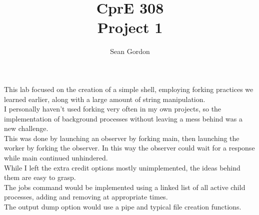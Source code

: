 \documentclass[12pt]{article}
\title{CprE 308\\Project 1}
\author{Sean Gordon}
\begin{document}
\maketitle

This lab focused on the creation of a simple shell, employing forking practices we learned earlier, along with a large amount of string manipulation.\\
I personally haven't used forking very often in my own projects, so the implementation of background processes without leaving a mess behind was a new challenge.\\
This was done by launching an observer by forking main, then launching the worker by forking the observer. In this way the observer could wait for a response while main continued unhindered.\\

While I left the extra credit options mostly unimplemented, the ideas behind them are easy to grasp.\\
The jobs command would be implemented using a linked list of all active child processes, adding and removing at appropriate times.\\
The output dump option would use a pipe and typical file creation functions.\\
\end{document}
